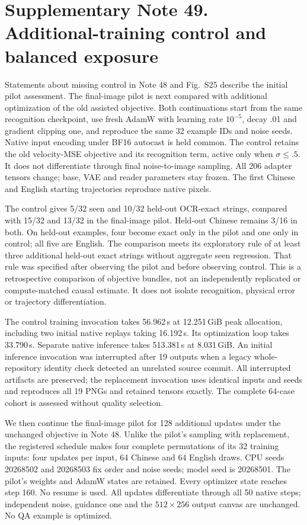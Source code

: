 \clearpage
\section*{Supplementary Note 49. Additional-training control and balanced exposure}

Statements about missing control in Note 48 and Fig.~S25 describe the initial
pilot assessment. The final-image pilot is next compared with additional optimization of the
old assisted objective. Both continuations start from the same recognition
checkpoint, use fresh AdamW with learning rate $10^{-5}$, decay .01 and
gradient clipping one, and reproduce the same 32 example IDs and noise seeds.
Native input encoding under BF16 autocast is held common. The control retains
the old velocity-MSE objective and its recognition term, active only when
$\sigma\leq .5$. It does not differentiate through final noise-to-image sampling.
All 206 adapter tensors change; base, VAE and reader parameters stay frozen.
The first Chinese and English starting trajectories reproduce native pixels.

The control gives 5/32 seen and 10/32 held-out OCR-exact strings, compared
with 15/32 and 13/32 in the final-image pilot. Held-out Chinese remains 3/16
in both. On held-out examples, four become exact only in the pilot and one
only in control; all five are English. The comparison meets its exploratory
rule of at least three additional held-out exact strings without aggregate
seen regression. That rule was specified after observing the pilot and before
observing control. This is a retrospective comparison of objective bundles,
not an independently replicated or compute-matched causal estimate. It does
not isolate recognition, physical error or trajectory differentiation.

The control training invocation takes 56.962\,s at 12.251\,GiB peak allocation,
including two initial native replays taking 16.192\,s. Its optimization loop
takes 33.790\,s. Separate native inference takes 513.381\,s at 8.031\,GiB.
An initial inference invocation was interrupted after 19 outputs when a
legacy whole-repository identity check detected an unrelated source commit.
All interrupted artifacts are preserved; the replacement invocation uses
identical inputs and seeds and reproduces all 19 PNGs and retained tensors
exactly. The complete 64-case cohort is assessed without quality selection.

We then continue the final-image pilot for 128 additional updates under the
unchanged objective in Note 48. Unlike the pilot's sampling with replacement,
the registered schedule makes four complete permutations of its 32 training
inputs: four updates per input, 64 Chinese and 64 English draws. CPU seeds
20268502 and 20268503 fix order and noise seeds; model seed is 20268501.
The pilot's weights and AdamW states are retained. Every optimizer state
reaches step 160. No resume is used. All updates differentiate through all
50 native steps; independent noise, guidance one and the $512\times256$
output canvas are unchanged. No QA example is optimized.

